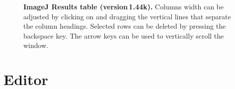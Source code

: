 
\noindent 
\begin{figure}

\noindent \caption{\textbf{ImageJ Results table (version\,1.44k).} Columns width can
be adjusted by clicking on and dragging the vertical lines that separate
the column headings. Selected rows can be deleted by pressing the
backspace key. The arrow keys can be used to vertically scroll the
window.}
\end{figure}



\section{Editor\label{sub:ImageJ-Macro-Editor}}

